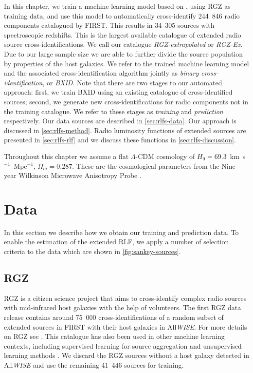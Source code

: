 \documentclass[11pt, a4paper]{book}
\newcommand{\defn}[1]{\emph{#1}}
\newcommand{\ncomponents}{244~846}
\newcommand{\nsourceszsp}{34~305}
\begin{document}
In this chapter, we train a machine learning model based on \citet{alger18radio}, using RGZ as training data, and
use this model to automatically cross-identify \ncomponents{} radio components catalogued by FIRST. This results in \nsourceszsp{} sources
with spectroscopic redshifts. This is the largest available catalogue of
extended radio source cross-identifications. We call our catalogue
\defn{RGZ-extrapolated} or \defn{RGZ-Ex}. Due to our large sample size we are able to further divide the
source population by properties of the host galaxies. We refer to the trained machine learning model and the associated cross-identification algorithm jointly as \defn{binary cross-identification}, or \defn{BXID}. Note that there are two stages to our automated approach: first, we train BXID using an existing catalogue of cross-identified sources; second, we generate new cross-identifications for radio components not in the training catalogue. We refer to these stages as \defn{training} and \defn{prediction} respectively. Our data sources are described in \autoref{sec:rlfs-data}. Our approach is discussed in \autoref{sec:rlfs-method}. Radio luminosity functions of extended sources are presented in \autoref{sec:rlfs-rlf} and we discuss these functions in \autoref{sec:rlfs-discussion}.

Throughout this chapter we assume a flat $\Lambda$-CDM cosmology of \linebreak $H_0 =
69.3$~km~s$^{-1}$~Mpc$^{-1}$, $\Omega_m = 0.287$. These are the cosmological
parameters from the Nine-year Wilkinson Microwave Anisotropy Probe
\citep[WMAP9;][]{hinshaw13wmap9}.

\section{Data} \label{sec:rlfs-data}

In this section we describe how we obtain our training and prediction data. To enable the estimation of the extended RLF, we apply a number of selection criteria to the data which are shown in \autoref{fig:sankey-sources}.

    \subsection{RGZ} \label{sec:rlfs-rgz-data}

    RGZ is a citizen science project that aims to cross-identify complex radio sources with mid-infrared host galaxies with the help of volunteers. The first RGZ data release contains around 75~000 cross-identifications of a random subset of extended sources in FIRST with their host galaxies in All\emph{WISE}. For more details on RGZ see \citet{banfield15}. This catalogue has also been used in other machine learning contexts, including supervised learning for source aggregation \citep{wu19claran} and unsupervised learning methods \citep{galvin19som,ralph19ae}. We discard the RGZ sources without a host galaxy detected in All\emph{WISE} and use the remaining 41~446 sources for training.
\end{document}
